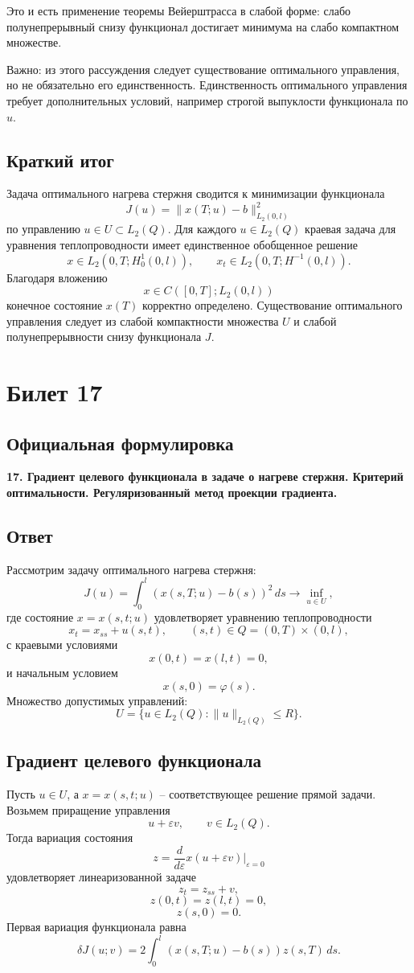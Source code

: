 \documentclass[12pt,a4paper]{article}
\begin{document}
Это и есть применение теоремы Вейерштрасса в слабой форме: слабо полунепрерывный снизу функционал достигает минимума на слабо компактном множестве.

Важно: из этого рассуждения следует существование оптимального управления, но не обязательно его единственность. Единственность оптимального управления требует дополнительных условий, например строгой выпуклости функционала по \(u\).

\subsection*{Краткий итог}
Задача оптимального нагрева стержня сводится к минимизации функционала
\[
J(u)=\|x(T;u)-b\|_{L_2(0,l)}^2
\]
по управлению \(u\in U\subset L_2(Q)\). Для каждого \(u\in L_2(Q)\) краевая задача для уравнения теплопроводности имеет единственное обобщенное решение
\[
x\in L_2(0,T;H_0^1(0,l)),
\qquad
x_t\in L_2(0,T;H^{-1}(0,l)).
\]
Благодаря вложению
\[
x\in C([0,T];L_2(0,l))
\]
конечное состояние \(x(T)\) корректно определено. Существование оптимального управления следует из слабой компактности множества \(U\) и слабой полунепрерывности снизу функционала \(J\).

\newpage

\section*{Билет 17}
\subsection*{Официальная формулировка}
\textbf{17. Градиент целевого функционала в задаче о нагреве стержня. Критерий оптимальности. Регуляризованный метод проекции градиента.}

\subsection*{Ответ}
Рассмотрим задачу оптимального нагрева стержня:
\[
J(u)=\int_0^l (x(s,T;u)-b(s))^2\,ds\to\inf_{u\in U},
\]
где состояние \(x=x(s,t;u)\) удовлетворяет уравнению теплопроводности
\[
x_t=x_{ss}+u(s,t),
\qquad (s,t)\in Q=(0,T)\times(0,l),
\]
с краевыми условиями
\[
x(0,t)=x(l,t)=0,
\]
и начальным условием
\[
x(s,0)=\varphi(s).
\]
Множество допустимых управлений:
\[
U=\{u\in L_2(Q):\|u\|_{L_2(Q)}\le R\}.
\]

\subsection*{Градиент целевого функционала}
Пусть \(u\in U\), а \(x=x(s,t;u)\) -- соответствующее решение прямой задачи. Возьмем приращение управления
\[
u+\varepsilon v,
\qquad v\in L_2(Q).
\]
Тогда вариация состояния
\[
z=\frac{d}{d\varepsilon}x(u+\varepsilon v)\bigg|_{\varepsilon=0}
\]
удовлетворяет линеаризованной задаче
\[
z_t=z_{ss}+v,
\]
\[
z(0,t)=z(l,t)=0,
\]
\[
z(s,0)=0.
\]
Первая вариация функционала равна
\[
\delta J(u;v)=
2\int_0^l (x(s,T;u)-b(s))z(s,T)\,ds.
\]
\end{document}

